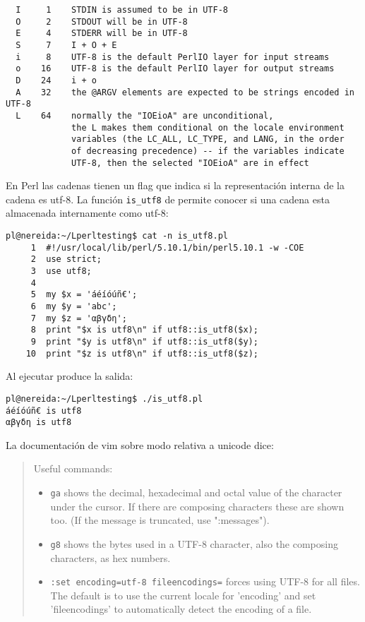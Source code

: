 \begin{htmlonly}
\begin{htmlonly}
\begin{verbatim}
  I     1    STDIN is assumed to be in UTF-8
  O     2    STDOUT will be in UTF-8
  E     4    STDERR will be in UTF-8
  S     7    I + O + E
  i     8    UTF-8 is the default PerlIO layer for input streams
  o    16    UTF-8 is the default PerlIO layer for output streams
  D    24    i + o
  A    32    the @ARGV elements are expected to be strings encoded in UTF-8
  L    64    normally the "IOEioA" are unconditional,
             the L makes them conditional on the locale environment
             variables (the LC_ALL, LC_TYPE, and LANG, in the order
             of decreasing precedence) -- if the variables indicate
             UTF-8, then the selected "IOEioA" are in effect

\end{verbatim}

En Perl las cadenas tienen un flag que indica si la representación interna 
de la cadena es utf-8.
La función \verb|is_utf8| de  permite conocer
si una cadena esta almacenada internamente como utf-8:
\begin{verbatim}
pl@nereida:~/Lperltesting$ cat -n is_utf8.pl
     1  #!/usr/local/lib/perl/5.10.1/bin/perl5.10.1 -w -COE
     2  use strict;
     3  use utf8;
     4
     5  my $x = 'áéíóúñ€';
     6  my $y = 'abc';
     7  my $z = 'αβγδη';
     8  print "$x is utf8\n" if utf8::is_utf8($x);
     9  print "$y is utf8\n" if utf8::is_utf8($y);
    10  print "$z is utf8\n" if utf8::is_utf8($z);
\end{verbatim}
Al ejecutar produce la salida:
\begin{verbatim}
pl@nereida:~/Lperltesting$ ./is_utf8.pl
áéíóúñ€ is utf8
αβγδη is utf8
\end{verbatim}


La documentación de vim sobre modo 
relativa a unicode dice:
\begin{it}
\begin{quote}
Useful commands:
\begin{itemize}
\item \verb"ga" shows the decimal, hexadecimal and octal value of the character under
  the cursor.  If there are composing characters these are shown too.  (If the
  message is truncated, use ":messages").
\item \verb"g8" shows the bytes used in a UTF-8 character, also the composing
  characters, as hex numbers.
\item \verb":set encoding=utf-8 fileencodings=" forces using UTF-8 for all files.  The
  default is to use the current locale for 'encoding' and set 'fileencodings'
  to automatically detect the encoding of a file.
\end{itemize}


\end{quote}
\end{it}
\end{htmlonly}
\end{htmlonly}
